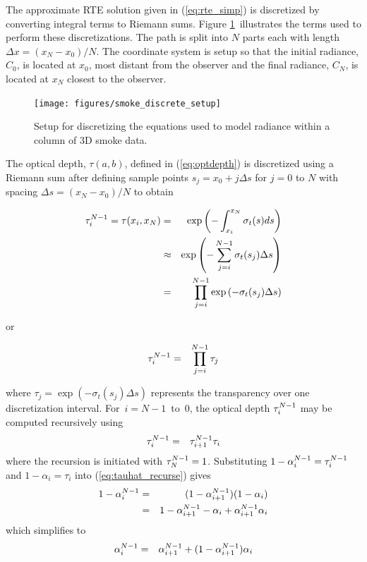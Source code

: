 The approximate RTE solution given in (\ref{eq:rte_simp}) is discretized by converting integral terms to Riemann sums. Figure \ref{fig:smokediscretesetup}\ illustrates the terms used to perform these discretizations.  The path is split into $N$ parts each with length $\Delta x=(x_N-x_0)/N$.  The coordinate system is setup so that the initial radiance, $C_0$, is located at $x_0$, most distant from the observer and the final radiance, $C_N$, is located at $x_N$ closest to the observer.

\begin{figure}[\figoptions]
\begin{center}
\texttt{[image: figures/smoke\_discrete\_setup]}
\end{center}
\caption {Setup for discretizing the equations used to model
radiance within a column of 3D smoke data.}
\label{fig:smokediscretesetup}
\end{figure}

The optical depth, $\tau(a,b)$, defined in (\ref{eq:optdepth}) is discretized using a Riemann sum  after defining sample points $s_j=x_0+j\Delta s$ for $j=0$ to $N$ with spacing $\Delta s=(x_N-x_0)/N$ to obtain

\begin{eqnarray*}
\tau_{i}^{N-1}=\tau(x_i,x_N)&=&\exp\left(-\int_{x_i}^{x_N}\sigma_t(s)ds\right)\\
&\approx&\exp\left(-\sum_{j=i}^{N-1}\sigma_t(s_j)\Delta s\right)\\
&=&\prod_{j=i}^{N-1}\exp\left(-\sigma_t(s_j)\Delta s\right)
\end{eqnarray*}

or

\begin{eqnarray*}
\tau_{i}^{N-1}&=&\prod_{j=i}^{N-1}\tau_j
\end{eqnarray*}

where $\tau_j=\exp\left(-\sigma_t(s_j)\Delta s\right)$ represents the transparency over one discretization interval.
For~$i=N-1$~to~$0$, the optical depth $\tau_{i}^{N-1}$ may be computed recursively using
\begin{eqnarray}
\label{eq:tauhat_recurse}
\tau_{i}^{N-1}&=&\tau_{i+1}^{N-1}\tau_i
\end{eqnarray}
where the recursion is initiated with $\tau_{N}^{N-1}=1$.
Substituting $1-\alpha_{i}^{N-1}=\tau_{i}^{N-1}$ and $1-\alpha_i=\tau_i$ into (\ref{eq:tauhat_recurse}) gives
\begin{eqnarray*}
1-\alpha_{i}^{N-1}&=&(1-\alpha_{i+1}^{N-1})(1-\alpha_i)\\
&=&1-\alpha_{i+1}^{N-1} - \alpha_i + \alpha_{i+1}^{N-1}\alpha_i
\end{eqnarray*}
which simplifies to
\begin{eqnarray}
\label{eq:alpha2}
\alpha_{i}^{N-1}&=&\alpha_{i+1}^{N-1} + (1-\alpha_{i+1}^{N-1})\alpha_i
\end{eqnarray}

